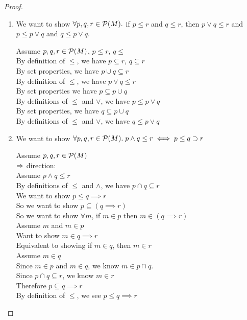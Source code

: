 \begin{proof}
\begin{enumerate}
\item We want to show $\forall p,q,r \in \mathcal{P}(M).$ if $p \leq r$ and $q \leq r$, then
      $p \vee q \leq r$ and
      $p \leq p \vee q$ and $q \leq p \vee q$.

  \begin{tabbedproof}
    Assume $p, q, r \in \mathcal{P}(M)$, $p \leq r$, $q \leq $ \\[1em]
    \oo By definition of $\leq$, we have $p \subseteq r$, $q \subseteq r$ \\
    \oo By set properties, we have $p \cup q \subseteq r$ \\
    \oo By definition of $\leq$, we have $p \vee q \leq r$ \\[1em]

    \oo By set properties we have $p \subseteq p \cup q$ \\
    \oo By definitions of $\leq$ and $\vee$, we have $p \leq p \vee q$ \\[1em]
  
    \oo By set properties, we have $q \subseteq p \cup q$ \\
    \oo By definitions of $\leq$ and $\vee$, we have  $q \leq p \vee q$ \\
  \end{tabbedproof}

\item We want to show $\forall p, q, r \in \mathcal{P}(M).\; p \land q \leq r \iff p \leq q \supset r$

  \begin{tabbedproof}
    Assume $p,q,r \in \mathcal{P}(M)$ \\[1em]

    $\Rightarrow$ direction: \\
    \oo Assume $p \land q \leq r$ \\
    \ooo By definitions of $\leq$ and $\land$, we have $p \cap q \subseteq r$ \\
    \ooo We want to show $p \leq q \implies r$ \\
    \ooo So we want to show $p \subseteq (q \implies r)$ \\
    \ooo So we want to show $\forall m$, if $m \in p$ then $m \in (q \implies r)$ \\
    \ooo Assume $m$ and $m \in p$ \\
    \oooo Want to show $m \in q \implies r$ \\
    \oooo Equivalent to showing if $m \in q$, then $m \in r$ \\
    \oooo Assume $m \in q$ \\
    \ooooo Since $m \in p$ and $m \in q$, we know $m \in p \cap q$. \\
    \ooooo Since $p \cap q \subseteq r$, we know $m \in r$ \\
    \ooo Therefore $p \subseteq q \implies r$ \\
    \ooo By definition of $\leq$, we see $p \leq q \implies r$ \\[1em]


\end{tabbedproof}
\end{enumerate}
\end{proof}
